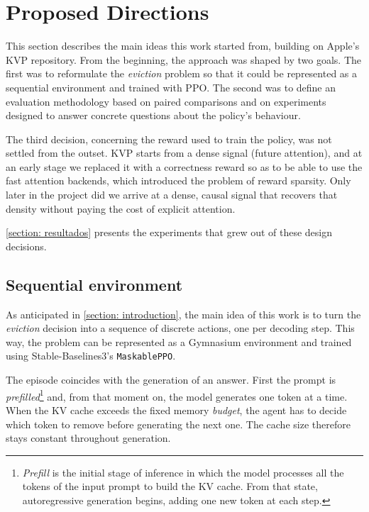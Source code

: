 \section{Proposed Directions} \label{section: dir_propuestas}

This section describes the main ideas this work started from, building on Apple's KVP repository. From the beginning, the approach was shaped by two goals. The first was to reformulate the \textit{eviction} problem so that it could be represented as a sequential environment and trained with PPO. The second was to define an evaluation methodology based on paired comparisons and on experiments designed to answer concrete questions about the policy's behaviour.

The third decision, concerning the reward used to train the policy, was not settled from the outset. KVP starts from a dense signal (future attention), and at an early stage we replaced it with a correctness reward so as to be able to use the fast attention backends, which introduced the problem of reward sparsity.
Only later in the project did we arrive at a dense, causal signal that recovers that density without paying the cost of explicit attention.

\cref{section: resultados} presents the experiments that grew out of these design decisions.


\subsection{Sequential environment}

As anticipated in \cref{section: introduction}, the main idea of this work is to turn the \textit{eviction} decision into a sequence of discrete actions, one per decoding step. This way, the problem can be represented as a Gymnasium environment and trained using Stable-Baselines3's \texttt{MaskablePPO}.

The episode coincides with the generation of an answer. First the prompt is \textit{prefilled}\footnote{\textit{Prefill} is the initial stage of inference in which the model processes all the tokens of the input prompt to build the KV cache. From that state, autoregressive generation begins, adding one new token at each step.} and, from that moment on, the model generates one token at a time. When the KV cache exceeds the fixed memory \textit{budget}, the agent has to decide which token to remove before generating the next one. The cache size therefore stays constant throughout generation.

